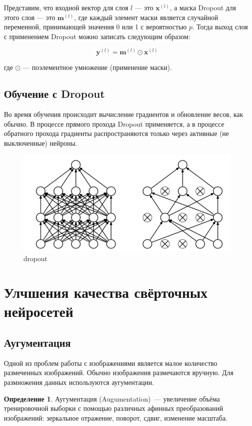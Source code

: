 \documentclass{article}
\theoremstyle{definition}
\newtheorem{definition}{Определение}
\theoremstyle{theorem}
\theoremstyle{remark}
\theoremstyle{theorem}
\theoremstyle{example}
\theoremstyle{theorem}
\theoremstyle{theorem}
\theoremstyle{theorem}
\theoremstyle{theorem}
\begin{document}
		Представим, что входной вектор для слоя $l$ — это $\mathbf{x}^{(l)}$, а маска Dropout для этого слоя — это $\mathbf{m}^{(l)}$, где каждый элемент маски является случайной переменной, принимающей значения 0 или 1 с вероятностью $p$. Тогда выход слоя с применением Dropout можно записать следующим образом:
		
		\[
		\mathbf{y}^{(l)} = \mathbf{m}^{(l)} \odot \mathbf{x}^{(l)}
		\]
		
		где $\odot$ — поэлементное умножение (применение маски).
		
		\subsection{Обучение с Dropout}
		
		Во время обучения происходит вычисление градиентов и обновление весов, как обычно. В процессе прямого прохода Dropout применяется, а в процессе обратного прохода градиенты распространяются только через активные (не выключенные) нейроны.
		\begin{figure}[h!]
			\includegraphics[width=\textwidth]{drop.png}\caption{dropout}
		\end{figure}
		\section{Улчшения качества свёрточных нейросетей} 
			\subsection{Аугументация}
				Одной из проблем работы с изображениями является малое количество размеченных изображений. Обычно изображения размечаются вручную. Для размножения данных используются аугументации.
				
		\begin{definition}
			Аугументация (Augumentation)~--- увеличение объёма тренировочной выборки с помощью различных афинных преобразований изображений: зеркальное отражение, поворот, сдвиг, изменение масштаба.
		\end{definition}
		
\end{document}
